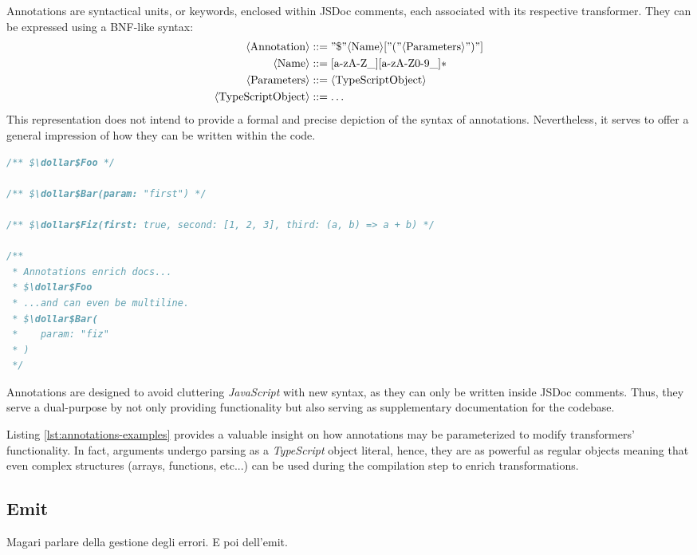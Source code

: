 Annotations are syntactical units, or keywords, enclosed within JSDoc comments,
each associated with its respective transformer.
They can be expressed using a BNF-like syntax:
\begin{equation*}
\begin{aligned}
    \langle \text{Annotation} \rangle & ::= "\$" \langle \text{Name} \rangle [ "(" \langle \text{Parameters} \rangle ")" ] \\
    \langle \text{Name} \rangle & ::= [\text{a-zA-Z\_}][\text{a-zA-Z0-9\_}]* \\
    \langle \text{Parameters} \rangle & ::= \langle \text{TypeScriptObject} \rangle \\
    \langle \text{TypeScriptObject} \rangle & ::= \dots \\
\end{aligned}
\end{equation*}
This representation does not intend to provide a formal and precise depiction of the syntax of annotations.
Nevertheless, it serves to offer a general impression of how they can be written within the code.
\begin{lstlisting}[language=javascript, caption={Generic examples of annotation.}, label={lst:annotations-examples}]
/** $\dollar$Foo */

/** $\dollar$Bar(param: "first") */

/** $\dollar$Fiz(first: true, second: [1, 2, 3], third: (a, b) => a + b) */

/**
 * Annotations enrich docs...
 * $\dollar$Foo
 * ...and can even be multiline.
 * $\dollar$Bar(
 *    param: "fiz"
 * )
 */
\end{lstlisting}

Annotations are designed to avoid cluttering \textit{JavaScript} with new syntax,
as they can only be written inside JSDoc comments.
Thus, they serve a dual-purpose by not only providing functionality
but also serving as supplementary documentation for the codebase.

Listing \ref{lst:annotations-examples} provides a valuable insight on how annotations
may be parameterized to modify transformers' functionality.
In fact, arguments undergo parsing as a \textit{TypeScript} object literal,
hence, they are as powerful as regular objects\cite{mdn_objects}
meaning that even complex structures (arrays, functions, etc...) can be used
during the compilation step to enrich transformations.

\subsection{Emit}

Magari parlare della gestione degli errori. E poi dell'emit.
